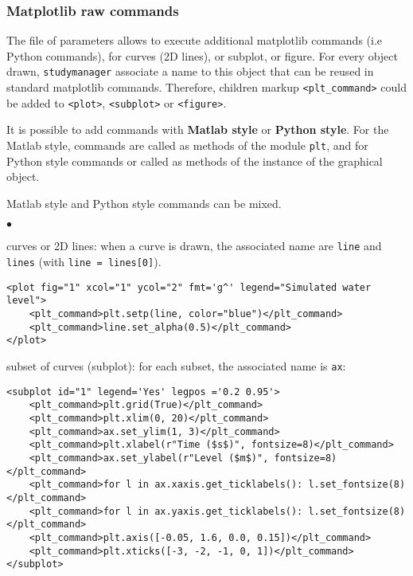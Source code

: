 \documentclass[a4paper,10pt,twoside]{csshortdoc}
\begin{document}
\subsubsection{Matplotlib raw commands}\label{sec:raw}

The file of parameters allows to execute additional matplotlib commands (i.e
Python commands), for curves (2D lines), or subplot, or figure. For every object
drawn, \texttt{studymanager} associate a name to this object that can be reused in
standard matplotlib commands. Therefore, children markup \texttt{<plt\_command>}
could be added to \texttt{<plot>}, \texttt{<subplot>} or \texttt{<figure>}.

It is possible to add commands with \textbf{Matlab style} or \textbf{Python
style}. For the Matlab style, commands are called as methods of the module
\texttt{plt}, and for Python style commands or called as methods of the instance
of the graphical object.

Matlab style and Python style commands can be mixed.

\begin{list}{$\bullet$}{}

\item curves or 2D lines: when a curve is drawn, the associated name
are \texttt{line} and \texttt{lines} (with \texttt{line = lines[0]}).

\small
\begin{verbatim}
<plot fig="1" xcol="1" ycol="2" fmt='g^' legend="Simulated water level">
    <plt_command>plt.setp(line, color="blue")</plt_command>
    <plt_command>line.set_alpha(0.5)</plt_command>
</plot>
\end{verbatim}
\normalsize

\item subset of curves (subplot): for each subset, the associated name is \texttt{ax}:

\small
\begin{verbatim}
<subplot id="1" legend='Yes' legpos ='0.2 0.95'>
    <plt_command>plt.grid(True)</plt_command>
    <plt_command>plt.xlim(0, 20)</plt_command>
    <plt_command>ax.set_ylim(1, 3)</plt_command>
    <plt_command>plt.xlabel(r"Time ($s$)", fontsize=8)</plt_command>
    <plt_command>ax.set_ylabel(r"Level ($m$)", fontsize=8)</plt_command>
    <plt_command>for l in ax.xaxis.get_ticklabels(): l.set_fontsize(8)</plt_command>
    <plt_command>for l in ax.yaxis.get_ticklabels(): l.set_fontsize(8)</plt_command>
    <plt_command>plt.axis([-0.05, 1.6, 0.0, 0.15])</plt_command>
    <plt_command>plt.xticks([-3, -2, -1, 0, 1])</plt_command>
</subplot>
\end{verbatim}
\normalsize


\end{list}
\end{document}
